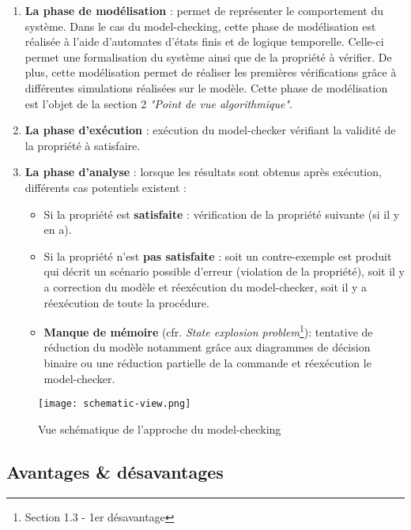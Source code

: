 \documentclass[runningheads,a4paper,10pt]{llncs}
\begin{document}
\begin{enumerate}
 \item  \textbf{La phase de modélisation} : permet de représenter le comportement du système. Dans le cas du model-checking, cette phase de modélisation est réalisée à l'aide d'automates d'états finis et de logique temporelle. Celle-ci permet une formalisation du système ainsi que de la propriété à vérifier. De plus, cette modélisation permet de réaliser les premières vérifications grâce à différentes simulations réalisées sur le modèle. Cette phase de modélisation est l'objet de la section 2 \textit{"Point de vue algorithmique"}. 
 \item  \textbf{La phase d'exécution} : exécution du model-checker vérifiant la validité de la propriété à satisfaire. 
 \item  \textbf{La phase d'analyse} : lorsque les résultats sont obtenus après exécution, différents cas potentiels existent : 
 \begin{itemize}
 \item Si la propriété est \textbf{satisfaite} : vérification de la propriété suivante (si il y en a). 
 \item Si la propriété n'est \textbf{pas satisfaite} : soit un contre-exemple est produit qui décrit un scénario possible d’erreur (violation de la propriété), soit il y a correction du modèle et réexécution du model-checker, soit il y a réexécution de toute la procédure. 
 \item \textbf{Manque de mémoire} (cfr. \textit{State explosion problem}\footnote{Section 1.3 - 1er désavantage}): tentative de réduction du modèle notamment grâce aux diagrammes de décision binaire ou une réduction partielle de la commande et réexécution le model-checker. 
 \end{itemize}
 \end{enumerate} 
 
 \newpage
 
 \begin{figure}
  \centering
  \texttt{[image: schematic-view.png]}
   \caption[Caption for LOF]{Vue schématique de l'approche du model-checking\protect\footnotemark}
\end{figure}


\subsection{Avantages \& désavantages}
\end{document}
